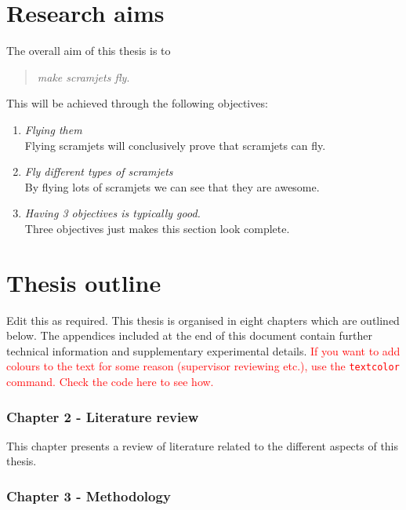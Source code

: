   \section{Research aims}

    The overall aim of this thesis is to

    \begin{quote}
      \emph{make scramjets fly}.
    \end{quote}

    \noindent This will be achieved through the following objectives:

    \begin{enumerate}
      \item \emph{Flying them}\\
      Flying scramjets will conclusively prove that scramjets can fly.

      \item \emph{Fly different types of scramjets}\\
      By flying lots of scramjets we can see that they are awesome. 

      \item \emph{Having 3 objectives is typically good.}\\
      Three objectives just makes this section look complete.
    \end{enumerate}

  \clearpage
  \section{Thesis outline}

    Edit this as required. This thesis is organised in eight chapters which are outlined below. The appendices included at the end of this document contain further technical information and supplementary experimental details. \textcolor{red}{If you want to add colours to the text for some reason (supervisor reviewing etc.), use the \texttt{textcolor} command. Check the code here to see how.}

    \subsubsection*{Chapter 2 - Literature review}

      This chapter presents a review of literature related to the different aspects of this thesis. 

    \subsubsection*{Chapter 3 - Methodology}

